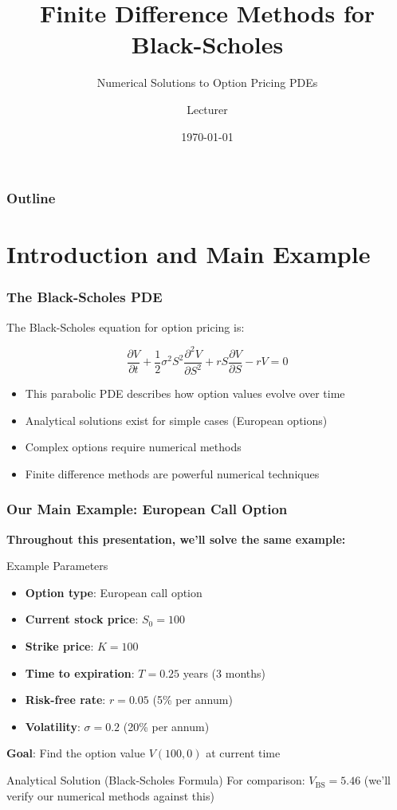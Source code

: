 \documentclass[aspectratio=169]{beamer}
\title{Finite Difference Methods for Black-Scholes}
\subtitle{Numerical Solutions to Option Pricing PDEs}
\author{Lecturer}
\date{\today}
\begin{document}
\begin{frame}
\titlepage
\end{frame}

\begin{frame}
\frametitle{Outline}
\tableofcontents
\end{frame}

\section{Introduction and Main Example}

\begin{frame}
\frametitle{The Black-Scholes PDE}
The Black-Scholes equation for option pricing is:

\[\frac{\partial V}{\partial t} + \frac{1}{2}\sigma^2 S^2 \frac{\partial^2 V}{\partial S^2} + rS \frac{\partial V}{\partial S} - rV = 0\]

\begin{itemize}
\item This parabolic PDE describes how option values evolve over time
\item Analytical solutions exist for simple cases (European options)
\item Complex options require numerical methods
\item Finite difference methods are powerful numerical techniques
\end{itemize}
\end{frame}

\begin{frame}
\frametitle{Our Main Example: European Call Option}
\textbf{Throughout this presentation, we'll solve the same example:}

\begin{block}{Example Parameters}
\begin{itemize}
\item \textbf{Option type}: European call option
\item \textbf{Current stock price}: \(S_0 = 100\)
\item \textbf{Strike price}: \(K = 100\)
\item \textbf{Time to expiration}: \(T = 0.25\) years (3 months)
\item \textbf{Risk-free rate}: \(r = 0.05\) (5\% per annum)
\item \textbf{Volatility}: \(\sigma = 0.2\) (20\% per annum)
\end{itemize}
\end{block}

\textbf{Goal}: Find the option value \(V(100, 0)\) at current time

\begin{block}{Analytical Solution (Black-Scholes Formula)}
For comparison: \(V_{\text{BS}} = 5.46\) (we'll verify our numerical methods against this)
\end{block}
\end{frame}
\end{document}
